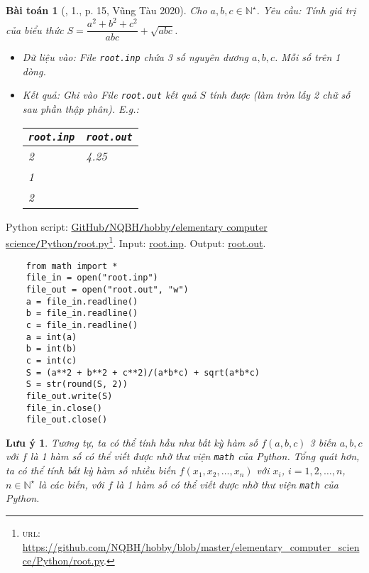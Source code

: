 \documentclass{article}
\newtheorem{baitoan}{Bài toán}
\newtheorem{luuy}{Lưu ý}
\begin{document}
\begin{baitoan}[\cite{VietSTEM2021}, 1., p. 15, Vũng Tàu 2020]
	Cho $a,b,c\in\mathbb{N}^\star$. {\sf Yêu cầu:} Tính giá trị của biểu thức $S = \dfrac{a^2 + b^2 + c^2}{abc} + \sqrt{abc}$.
	\begin{itemize}
		\item {\sf Dữ liệu vào:} File \verb|root.inp| chứa 3 số nguyên dương $a,b,c$. Mỗi số trên 1 dòng.
		\item {\sf Kết quả:} Ghi vào File \verb|root.out| kết quả $S$ tính được (làm tròn lấy 2 chữ số sau phần thập phân). E.g.:
		\begin{table}[H]
			\centering
			\begin{tabular}{|l|l|}
				\hline
				\texttt{root.inp} & \texttt{root.out} \\
				\hline
				2 & 4.25 \\
				1 &  \\
				2 &  \\
				\hline
			\end{tabular}
		\end{table}
	\end{itemize}
\end{baitoan}
Python script: \href{https://github.com/NQBH/hobby/blob/master/elementary_computer_science/Python/root.py}{GitHub\texttt{/}NQBH\texttt{/}hobby\texttt{/}elementary computer science\texttt{/}Python\texttt{/}root.py}\footnote{\textsc{url}: \url{https://github.com/NQBH/hobby/blob/master/elementary_computer_science/Python/root.py}.}. Input: \href{https://github.com/NQBH/hobby/blob/master/elementary_computer_science/Python/root.inp}{root.inp}. Output: \href{https://github.com/NQBH/hobby/blob/master/elementary_computer_science/Python/root.out}{root.out}.
\begin{verbatim}
	from math import *
	file_in = open("root.inp")
	file_out = open("root.out", "w")
	a = file_in.readline()
	b = file_in.readline()
	c = file_in.readline()
	a = int(a)
	b = int(b)
	c = int(c)
	S = (a**2 + b**2 + c**2)/(a*b*c) + sqrt(a*b*c)
	S = str(round(S, 2))
	file_out.write(S)
	file_in.close()
	file_out.close()
\end{verbatim}

\begin{luuy}
	Tương tự, ta có thể tính hầu như bất kỳ hàm số $f(a,b,c)$ 3 biến $a,b,c$ với $f$ là 1 hàm số có thể viết được nhờ thư viện \texttt{math} của Python. Tổng quát hơn, ta có thể tính bất kỳ hàm số nhiều biến $f(x_1,x_2,\ldots,x_n)$ với $x_i$, $i = 1,2,\ldots,n$, $n\in\mathbb{N}^\star$ là các biến, với $f$ là 1 hàm số có thể viết được nhờ thư viện \texttt{math} của Python.
\end{luuy}
\end{document}
